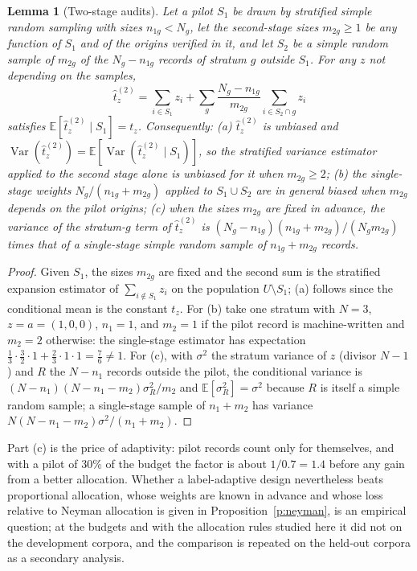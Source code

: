 \documentclass[11pt]{article}
\newtheorem{lemma}{Lemma}
\theoremstyle{definition}
\newcommand{\E}{\mathbb{E}}
\newcommand{\Var}{\operatorname{Var}}
\begin{document}
\begin{lemma}[Two-stage audits]\label{l:twostage}
Let a pilot $S_1$ be drawn by stratified simple random sampling with sizes
$n_{1g}<N_g$, let the second-stage sizes $m_{2g}\ge1$ be any function of $S_1$ and of the
origins verified in it, and let $S_2$ be a simple random sample of $m_{2g}$ of the
$N_g-n_{1g}$ records of stratum $g$ outside $S_1$. For any $z$ not depending on the samples,
\begin{equation}\label{eq:twostage}
\hat t^{(2)}_z=\sum_{i\in S_1}z_i+\sum_g\frac{N_g-n_{1g}}{m_{2g}}\sum_{i\in S_2\cap g}z_i
\end{equation}
satisfies $\E[\hat t^{(2)}_z\mid S_1]=t_z$. Consequently:
(a) $\hat t^{(2)}_z$ is unbiased and $\Var(\hat t^{(2)}_z)=\E[\Var(\hat t^{(2)}_z\mid S_1)]$, so
the stratified variance estimator applied to the second stage alone is unbiased for it when
$m_{2g}\ge2$;
(b) the single-stage weights $N_g/(n_{1g}+m_{2g})$ applied to $S_1\cup S_2$ are in general
biased when $m_{2g}$ depends on the pilot origins;
(c) when the sizes $m_{2g}$ are fixed in advance, the variance of the stratum-$g$ term of
$\hat t^{(2)}_z$ is $(N_g-n_{1g})(n_{1g}+m_{2g})/(N_gm_{2g})$ times that of a single-stage
simple random sample of $n_{1g}+m_{2g}$ records.
\end{lemma}
\begin{proof}
Given $S_1$, the sizes $m_{2g}$ are fixed and the second sum is the stratified expansion
estimator of $\sum_{i\notin S_1}z_i$ on the population $U\setminus S_1$; (a) follows since
the conditional mean is the constant $t_z$. For (b) take one stratum with $N=3$,
$z=a=(1,0,0)$, $n_1=1$, and $m_2=1$ if the pilot record is machine-written and $m_2=2$
otherwise: the single-stage estimator has expectation
$\tfrac13\cdot\tfrac32\cdot1+\tfrac23\cdot1\cdot1=\tfrac76\neq1$. For (c), with $\sigma^2$ the
stratum variance of $z$ (divisor $N-1$) and $R$ the $N-n_1$ records outside the pilot, the conditional
variance is $(N-n_1)(N-n_1-m_2)\sigma_R^2/m_2$ and $\E[\sigma_R^2]=\sigma^2$ because $R$ is
itself a simple random sample; a single-stage sample of $n_1+m_2$ has variance
$N(N-n_1-m_2)\sigma^2/(n_1+m_2)$.
\end{proof}
Part (c) is the price of adaptivity: pilot records count only for themselves, and with a
pilot of 30\% of the budget the factor is about $1/0.7=1.4$ before any gain from a better
allocation. Whether a label-adaptive design nevertheless beats proportional allocation,
whose weights are known in advance and whose loss relative to Neyman allocation is given
in Proposition~\ref{p:neyman}, is an empirical question; at the budgets and with the
allocation rules studied here it did not on the development corpora, and the comparison
is repeated on the held-out corpora as a secondary analysis.
\end{document}
